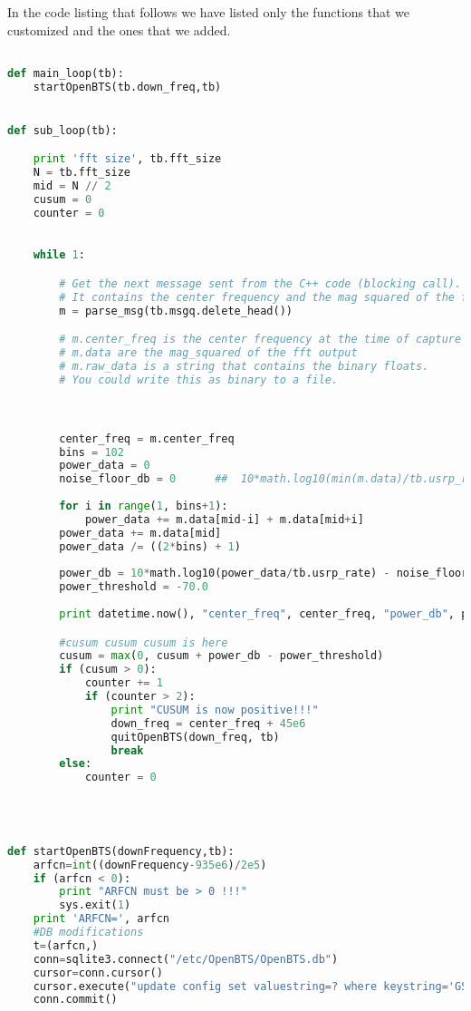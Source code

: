 In the code listing that follows we have listed only the functions that we
customized and the ones that we added.

\begin{lstlisting}[language=Python]

def main_loop(tb):
    startOpenBTS(tb.down_freq,tb)


def sub_loop(tb):

    print 'fft size', tb.fft_size
    N = tb.fft_size
    mid = N // 2
    cusum = 0
    counter = 0
    

    while 1:

        # Get the next message sent from the C++ code (blocking call).
        # It contains the center frequency and the mag squared of the fft
        m = parse_msg(tb.msgq.delete_head())

        # m.center_freq is the center frequency at the time of capture
        # m.data are the mag_squared of the fft output
        # m.raw_data is a string that contains the binary floats.
        # You could write this as binary to a file.



        center_freq = m.center_freq
        bins = 102
        power_data = 0
        noise_floor_db = 0      ##  10*math.log10(min(m.data)/tb.usrp_rate)
        
        for i in range(1, bins+1):
            power_data += m.data[mid-i] + m.data[mid+i]
        power_data += m.data[mid]
        power_data /= ((2*bins) + 1)
        
        power_db = 10*math.log10(power_data/tb.usrp_rate) - noise_floor_db
        power_threshold = -70.0
        
        print datetime.now(), "center_freq", center_freq, "power_db", power_db

        #cusum cusum cusum is here
        cusum = max(0, cusum + power_db - power_threshold)
        if (cusum > 0):
            counter += 1
            if (counter > 2):
                print "CUSUM is now positive!!!"
                down_freq = center_freq + 45e6
                quitOpenBTS(down_freq, tb)
                break
        else:
            counter = 0




def startOpenBTS(downFrequency,tb):
    arfcn=int((downFrequency-935e6)/2e5)
    if (arfcn < 0):
        print "ARFCN must be > 0 !!!"
        sys.exit(1)
    print 'ARFCN=', arfcn
    #DB modifications
    t=(arfcn,)
    conn=sqlite3.connect("/etc/OpenBTS/OpenBTS.db")
    cursor=conn.cursor()
    cursor.execute("update config set valuestring=? where keystring='GSM.Radio.C0'",t)
    conn.commit()


\end{lstlisting}
